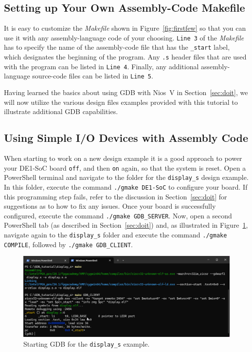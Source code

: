\documentclass[11pt, twoside, pdftex]{article}
\begin{document}
\subsection{Setting up Your Own Assembly-Code Makefile}
\label{sec:yourownass}

It is easy to customize the {\it Makefile} shown in Figure~\ref{fig:firstfew} so that you
can use it with any assembly-language code of your choosing.  \texttt{Line 3} of the
{\it Makefile} has to specify the name of the assembly-code file that has the \texttt{\_start}
label, which designates the beginning of the program. Any \texttt{.s} header files that are
used with the program can be listed in \texttt{Line 4}. Finally, any additional 
assembly-language source-code files can be listed in \texttt{Line 5}. 

Having learned the basics about using GDB with Nios~V in Section~\ref{sec:doit}, we will 
now utilize the various design files examples provided with this tutorial to illustrate
additional GDB capabilities. 

\subsection{Using Simple I/O Devices with Assembly Code}
\label{sec:simpleIO}

When starting to work on a new design example it is a good approach to power your DE1-SoC
board \texttt{off}, and then \texttt{on} again, so that the system is reset.   
Open a PowerShell terminal and navigate to the folder for the \texttt{display\_s} design
example. In this folder, execute the command \texttt{./gmake DE1-SoC} to configure your board. 
If this programming step fails, refer to the discussion in Section~\ref{sec:doit} for
suggestions as to how to fix any issues. Once your board is successfully configured,
execute the command \texttt{./gmake GDB\_SERVER}. Now, open a second
PowerShell tab (as described in Section~\ref{sec:doit}) and, as illustrated in 
Figure~\ref{fig:display_s1}, navigate again to the \texttt{display\_s} folder and 
execute the command \texttt{./gmake COMPILE}, followed by \texttt{./gmake GDB\_CLIENT}.

\begin{figure}[h]
    \begin{center}
        \includegraphics[scale=.6]{figures/display_s1.png}
        \caption{Starting GDB for the \texttt{display\_s} example.}
        \label{fig:display_s1}
    \end{center}
\end{figure}
\end{document}
